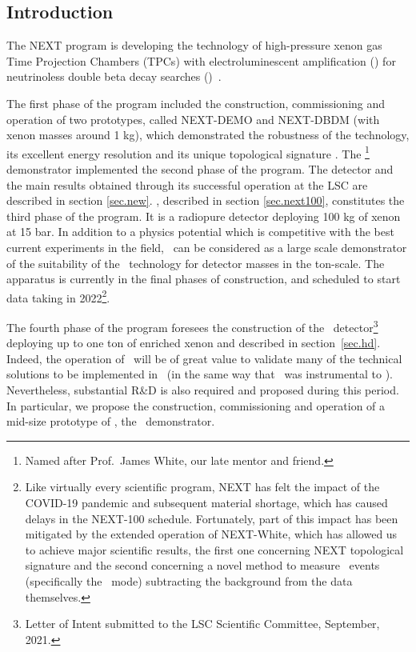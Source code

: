 \subsection{Introduction}

The NEXT program is developing the technology of high-pressure xenon gas Time Projection Chambers (TPCs) with electroluminescent amplification (\HPXeEL) for neutrinoless double beta decay searches (\bbonu)~\cite{Gomez-Cadenas:2019sfa}. 


The first phase of the program included the construction, commissioning and operation of two prototypes, called NEXT-DEMO and NEXT-DBDM (with xenon masses around 1 kg), which demonstrated the robustness of the technology, its excellent energy resolution and its unique topological signature \cite{Alvarez:2012xda, Alvarez:2013gxa, Alvarez:2012hh, Ferrario:2015kta}. The \NEW\footnote{Named after Prof.~James White, our late mentor and friend.} demonstrator implemented the second phase of the program. The detector and the main results obtained through its successful operation at the LSC are described in section \ref{sec.new}. \Next, described in section \ref{sec.next100}, constitutes the third phase of the program. It is a radiopure detector deploying 100 kg of xenon at 15 bar. In addition to a physics potential which is competitive with the best current experiments in the field, \Next\ can be considered as a large scale demonstrator of the suitability of the \HPXeEL\ technology for detector masses in the ton-scale. The apparatus is currently in the final phases of construction, and scheduled to start data taking in 2022\footnote{
Like virtually every scientific program, NEXT has felt the impact of the COVID-19 pandemic and subsequent material shortage, which has caused delays in the NEXT-100 schedule. Fortunately, part of this impact has been mitigated by the extended operation of NEXT-White, which has allowed us to achieve major scientific results, the first one concerning NEXT topological signature and the second concerning a novel method to measure \bb\ events
(specifically the \bbtnu\ mode) subtracting the background from the data themselves.}. 


The fourth phase of the program foresees the construction of the \NHD\ detector\footnote{Letter of Intent submitted to the LSC Scientific Committee, September,  2021.} deploying up to one ton of enriched xenon and described in section~\ref{sec.hd}. Indeed, the operation of \Next\ will be of great value to validate many of the technical solutions to be implemented in \NHD\ (in the same way that \NEW\ was instrumental to \Next). Nevertheless, substantial R\&D is also required and proposed during this period. In particular, we propose the construction, commissioning and operation of a mid-size prototype of \NHD, the \HDEMO\ demonstrator. 

